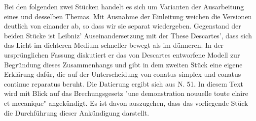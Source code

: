 \footnotesize\pstart Bei den folgenden zwei St\"{u}cken handelt es sich um Varianten der Ausarbeitung eines und desselben Themas. Mit Ausnahme der Einleitung weichen die Versionen deutlich von einander ab, so dass wir sie separat wiedergeben. Gegenstand der beiden St\"{u}cke ist Leibniz' Auseinandersetzung mit der These Descartes'\protect{}, dass sich das Licht im dichteren Medium schneller bewegt als im d\"{u}nneren. In der urspr\"{u}nglichen Fassung diskutiert er das von Descartes\protect{} entworfene Modell zur Begr\"{u}ndung dieses Zusammenhangs und gibt in dem zweiten St\"{u}ck eine eigene Erkl\"{a}rung daf\"{u}r, die auf der Unterscheidung von conatus simplex und conatus continue reparatus beruht. Die Datierung ergibt sich aus N. 51. In diesem Text wird mit Blick auf das Brechungsgesetz "une demonstration nouuelle toute claire et mecanique" angek\"{u}ndigt. Es ist davon auszugehen, dass das vorliegende St\"{u}ck die Durchf\"{u}hrung dieser Ank\"{u}ndigung darstellt.\pend\normalsize